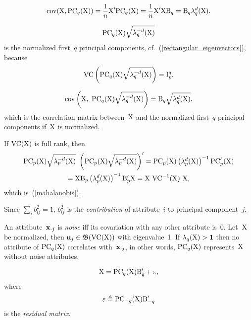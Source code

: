 \documentclass[10pt,a4paper]{article}
\theoremstyle{plain} \newtheorem{Lem}{Lemma}
\begin{document}
$$ \mathrm {cov}(\mathrm X, \mathrm {PC}_q(\mathrm X)) = \frac 1 n \mathrm X' \mathrm {PC}_q(\mathrm X) = \frac 1 n \mathrm X' \mathrm X \mathrm B_q = \mathrm B_q \mathbf \lambda_q^d(\mathrm X). $$

$$ \mathrm {PC}_q(\mathrm X) \sqrt{\mathbf \lambda_q^{-d}(\mathrm X)} $$
is the normalized first~$q$ principal components, cf.~(\ref{rectangular_eigenvectors}),
because
$$ \mathrm {VC} \left(\mathrm {PC}_q(\mathrm X) \sqrt{\mathbf \lambda_q^{-d}(\mathrm X)} \right) = \mathrm I^q_p. $$

$$ \mathrm {cov} \left(\mathrm X, \ \mathrm {PC}_q(\mathrm X) \sqrt{\mathbf \lambda_q^{-d}(\mathrm X)} \right) = \mathrm B_q \sqrt{\mathbf \lambda_q^d(\mathrm X)}, $$
which is the correlation matrix between~$\mathrm X$ and the normalized first~$q$ principal components if~$\mathrm X$ is normalized.

If $\mathrm {VC}(\mathrm X)$ is full rank, then
\begin{multline*}
$$ \PC_p(\mat X) \sqrt{\ve \lambda_p^{-d}(\mat X)} \ \left(\PC_p(\mat X) \sqrt{\ve \lambda_p^{-d}(\mat X)} \right)'
     = \PC_p(\mat X) \left(\ve \lambda_p^d(\mat X) \right)^{-1} \PC'_p(\mat X) \\
     = \mat X \mat B_p \left(\ve \lambda_p^d(\mat X) \right)^{-1} \mat B'_p \mat X
     = \mat X \ \VC^{-1}(\mat X) \ \mat X,
\end{multline*}
which is~(\ref{mahalanobis}).


Since $\sum_i b^2_{ij} = 1$, $b^2_{ij}$ is the {\em contribution} of attribute~$i$ to principal component~$j$.

An attribute~$\mathbf x_{\cdot j}$ is {\em noise} iff its covariation with any other attribute is~0.
Let~$\mathrm X$ be normalized,
then
$ \mathbf u_j \in \mathfrak B (\mathrm {VC}(\mathrm X)) $
with eigenvalue~1.
If $\mathbf \lambda_q(\mathrm X) > \mathbf 1$ then no attribute of $\mathrm {PC}_q(\mathrm X)$ correlates with~$\mathbf x_{\cdot j}$,
in other words, $\mathrm {PC}_q(\mathrm X)$ represents~$\mathrm X$ without noise attributes.

\begin{equation*}  \label{dataReduction}
\mathrm X = \mathrm {PC}_q(\mathrm X) \mathrm B_q' + \mathrm \varepsilon,
\end{equation*}
where
$$ \mathrm \varepsilon \triangleq \mathrm {PC}_{-q}(\mathrm X) \mathrm B_{-q}' $$
is the {\em residual matrix}.

\end{document}
